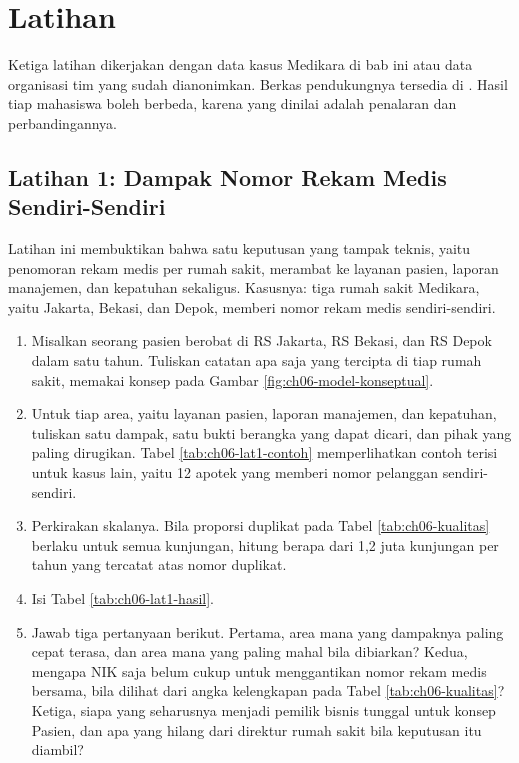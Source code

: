 \section{Latihan}

Ketiga latihan dikerjakan dengan data kasus Medikara di bab ini atau data
organisasi tim yang sudah dianonimkan. Berkas pendukungnya tersedia di
. Hasil tiap mahasiswa boleh berbeda, karena yang
dinilai adalah penalaran dan perbandingannya.

\subsection*{Latihan 1: Dampak Nomor Rekam Medis Sendiri-Sendiri}

Latihan ini membuktikan bahwa satu keputusan yang tampak teknis, yaitu
penomoran rekam medis per rumah sakit, merambat ke layanan pasien, laporan
manajemen, dan kepatuhan sekaligus. Kasusnya: tiga rumah sakit Medikara, yaitu
Jakarta, Bekasi, dan Depok, memberi nomor rekam medis sendiri-sendiri.

\begin{enumerate}
  \item Misalkan seorang pasien berobat di RS Jakarta, RS Bekasi, dan RS Depok
        dalam satu tahun. Tuliskan catatan apa saja yang tercipta di tiap rumah
        sakit, memakai konsep pada Gambar \ref{fig:ch06-model-konseptual}.
  \item Untuk tiap area, yaitu layanan pasien, laporan manajemen, dan
        kepatuhan, tuliskan satu dampak, satu bukti berangka yang dapat dicari,
        dan pihak yang paling dirugikan. Tabel \ref{tab:ch06-lat1-contoh}
        memperlihatkan contoh terisi untuk kasus lain, yaitu 12 apotek yang
        memberi nomor pelanggan sendiri-sendiri.
  \item Perkirakan skalanya. Bila proporsi duplikat pada Tabel
        \ref{tab:ch06-kualitas} berlaku untuk semua kunjungan, hitung berapa
        dari 1,2 juta kunjungan per tahun yang tercatat atas nomor duplikat.
  \item Isi Tabel \ref{tab:ch06-lat1-hasil}.
  \item Jawab tiga pertanyaan berikut. Pertama, area mana yang dampaknya paling
        cepat terasa, dan area mana yang paling mahal bila dibiarkan? Kedua,
        mengapa NIK saja belum cukup untuk menggantikan nomor rekam medis
        bersama, bila dilihat dari angka kelengkapan pada Tabel
        \ref{tab:ch06-kualitas}? Ketiga, siapa yang seharusnya menjadi pemilik
        bisnis tunggal untuk konsep Pasien, dan apa yang hilang dari direktur
        rumah sakit bila keputusan itu diambil?
\end{enumerate}

